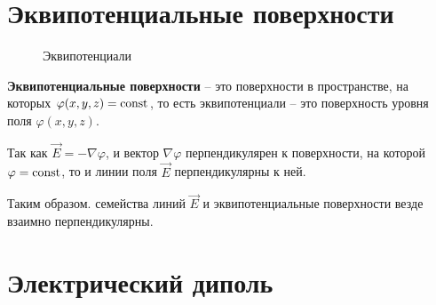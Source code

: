 \section{Эквипотенциальные поверхности}
    \begin{figure}[b!]
        \center
        \caption{Эквипотенциали}
    \end{figure}

    \begin{definition}
        \textbf{Эквипотенциальные поверхности} -- это поверхности в пространстве, 
        на которых \( \varphi (x, y, z) = \mathrm{const} \), то есть эквипотенциали --  
        это поверхность уровня поля \( \varphi (x, y, z) \). 
    \end{definition}
    
    Так как \( \vec{E} = -\nabla\varphi \), и вектор \( \nabla\varphi \) 
    перпендикулярен к поверхности, на которой \( \varphi = \mathrm{const} \), то и 
    линии поля \( \vec{E} \) перпендикулярны к ней.

    Таким образом. семейства линий \( \vec{E} \) и эквипотенциальные 
    поверхности везде взаимно перпендикулярны.
    
\section{Электрический диполь}

